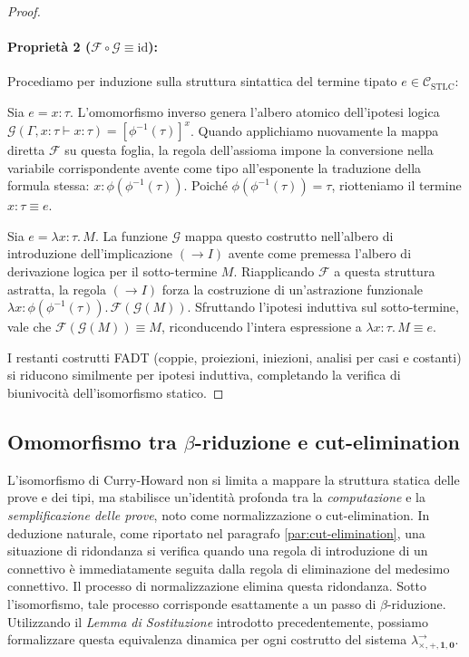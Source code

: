 \begin{proof}
    \paragraph{Proprietà 2 ($\mathcal{F} \circ \mathcal{G} \equiv \text{id}$):}
    Procediamo per induzione sulla struttura sintattica del termine tipato $e \in \mathcal{C}_{\text{STLC}}$:
    \begin{description}[leftmargin=1.5em, style=nextline, font=\bfseries]
        \item[Caso Variabile] 
            Sia $e = x:\tau$. L'omomorfismo inverso genera l'albero atomico dell'ipotesi logica $\mathcal{G}(\Gamma, x:\tau \vdash x:\tau) = [\phi^{-1}(\tau)]^x$. Quando 
            applichiamo nuovamente la mappa diretta $\mathcal{F}$ su questa foglia, la regola dell'assioma impone la conversione nella variabile corrispondente avente come 
            tipo all'esponente la traduzione della formula stessa: $x:{\phi(\phi^{-1}(\tau))}$. Poiché $\phi(\phi^{-1}(\tau)) = \tau$, riotteniamo il termine $x:\tau \equiv e$.
        \item[Caso Astrazione]
            Sia $e = \lambda x:\tau. \, M$. La funzione $\mathcal{G}$ mappa questo costrutto nell'albero di introduzione dell'implicazione $(\to I)$ avente come premessa 
            l'albero di derivazione logica per il sotto-termine $M$. Riapplicando $\mathcal{F}$ a questa struttura astratta, la regola $(\to I)$ forza la costruzione di 
            un'astrazione funzionale $\lambda x:{\phi(\phi^{-1}(\tau))}. \, \mathcal{F}(\mathcal{G}(M))$. Sfruttando l'ipotesi induttiva sul sotto-termine, vale che 
            $\mathcal{F}(\mathcal{G}(M)) \equiv M$, riconducendo l'intera espressione a $\lambda x:\tau. \, M \equiv e$.
    \end{description}
    I restanti costrutti FADT (coppie, proiezioni, iniezioni, analisi per casi e costanti) si riducono similmente per ipotesi induttiva, completando la verifica di biunivocità 
    dell'isomorfismo statico.
\end{proof}

\subsection{Omomorfismo tra \texorpdfstring{$\beta$}{beta}-riduzione e cut-elimination}
L'isomorfismo di Curry-Howard non si limita a mappare la struttura statica delle prove e dei tipi, ma stabilisce un'identità profonda tra la \emph{computazione} e 
la \emph{semplificazione delle prove}, noto come normalizzazione o cut-elimination. In deduzione naturale, come riportato nel paragrafo \ref{par:cut-elimination}, 
una situazione di ridondanza si verifica quando una regola di introduzione di un connettivo è immediatamente seguita dalla regola di eliminazione del medesimo 
connettivo. Il processo di normalizzazione elimina questa ridondanza. Sotto l'isomorfismo, tale processo corrisponde esattamente a un passo di $\beta$-riduzione.
Utilizzando il \emph{Lemma di Sostituzione} introdotto precedentemente, possiamo formalizzare questa equivalenza dinamica per ogni costrutto del sistema 
$\lambda^{\to}_{\times, +, \mathbf{1}, \mathbf{0}}$.

